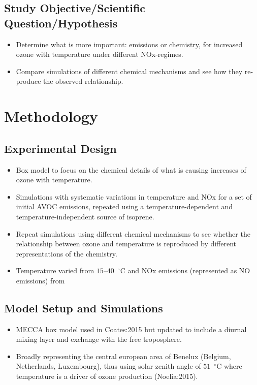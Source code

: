 \documentclass[11pt,a4paper]{article}
\begin{document}
\subsection{Study Objective/Scientific Question/Hypothesis}
\begin{itemize}
    \item Determine what is more important: emissions or chemistry, for increased ozone with temperature under different NOx-regimes.
    \item Compare simulations of different chemical mechanisms and see how they re-produce the observed relationship.
\end{itemize}

\section{Methodology} \label{s:methodology}
\subsection{Experimental Design}
\begin{itemize}
    \item Box model to focus on the chemical details of what is causing increases of ozone with temperature.
    \item Simulations with systematic variations in temperature and NOx for a set of initial AVOC emissions, repeated using a temperature-dependent and temperature-independent source of isoprene.
    \item Repeat simulations using different chemical mechanisms to see whether the relationship between ozone and temperature is reproduced by different representations of the chemistry.
    \item Temperature varied from $15$--$40$~$^{\circ}$C and NOx emissions (represented as NO emissions) from 
\end{itemize}

\subsection{Model Setup and Simulations}
\begin{itemize}
    \item MECCA box model used in Coates:2015 but updated to include a diurnal mixing layer and exchange with the free troposphere.
    \item Broadly representing the central european area of Benelux (Belgium, Netherlands, Luxembourg), thus using solar zenith angle of $51$~$^{\circ}$C where temperature is a driver of ozone production (Noelia:2015).
\end{itemize}
\end{document}
